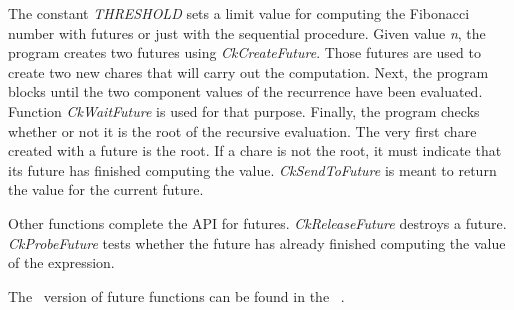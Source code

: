 The constant {\em THRESHOLD} sets a limit value for computing the Fibonacci
number with futures or just with the sequential procedure. Given value {\em n},
the program creates two futures using {\em CkCreateFuture}. Those futures are
used to create two new chares that will carry out the computation. Next, the
program blocks until the two component values of the recurrence have been
evaluated. Function {\em CkWaitFuture} is used for that purpose. Finally, the
program checks whether or not it is the root of the recursive evaluation. The very first
chare created with a future is the root. If a chare is not the root,
it must indicate that its future has finished computing the value. {\em
CkSendToFuture} is meant to return the value for the current future.

Other functions complete the API for futures. {\em CkReleaseFuture} destroys a
future. {\em CkProbeFuture} tests whether the future has already finished computing
the value of the expression.

The \converse\ version of future functions can be found in the \converse\
.

